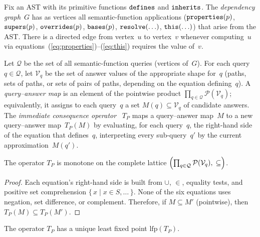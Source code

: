 \begin{definition}\label{def:dependency-graph}
  Fix an AST with its primitive functions $\mathtt{defines}$ and
  $\mathtt{inherits}$.
  The \emph{dependency graph}~$G$ has as vertices all
  semantic-function applications
  ($\mathtt{properties}(p)$, $\mathtt{supers}(p)$, $\mathtt{overrides}(p)$,
    $\mathtt{bases}(p)$, $\mathtt{resolve}(\ldots)$,
  $\mathtt{this}(\ldots)$) that arise from the AST\@.
  There is a directed edge from vertex~$u$ to vertex~$v$
  whenever computing~$u$ via
  equations~(\ref{eq:properties})--(\ref{eq:this})
  requires the value of~$v$.
\end{definition}

\begin{definition}%
  \label{def:tp-operator}
  Let $\mathcal{Q}$ be the set of all
  semantic-function queries
  (vertices of~$G$).
  For each query $q \in \mathcal{Q}$, let
  $\mathcal{V}_q$ be the set of answer values of the
  appropriate shape for~$q$
  (paths, sets of paths, or sets of pairs of paths,
  depending on the equation defining~$q$).
  A \emph{query--answer map} is an element of the
  pointwise product
  $\prod_{q \in \mathcal{Q}} \mathcal{P}(\mathcal{V}_q)$;
  equivalently, it assigns to each query~$q$ a set
  $M(q) \subseteq \mathcal{V}_q$ of candidate answers.
  The \emph{immediate consequence
  operator}~\cite{vanemden1976-predicate-logic-semantics}
  $T_P$ maps a query--answer map~$M$ to a new
  query--answer map~$T_P(M)$ by evaluating, for each
  query~$q$, the right-hand side of the equation that
  defines~$q$, interpreting every sub-query~$q'$ by
  the current approximation~$M(q')$.
\end{definition}

\begin{lemma}[Monotonicity]\label{lem:monotonicity}
  The operator $T_P$ is monotone on the complete lattice
  $\Bigl(\prod_{q \in \mathcal{Q}} \mathcal{P}(\mathcal{V}_q),\; \subseteq\Bigr)$.
\end{lemma}

\begin{proof}
  Each equation's right-hand side is built from
  $\cup$, $\in$, equality tests, and positive set
  comprehension $\{\, x \mid x \in S, \ldots \,\}$.
  None of the six equations uses negation, set
  difference, or complement.
  Therefore, if $M \subseteq M'$ (pointwise), then
  $T_P(M) \subseteq T_P(M')$.
\end{proof}

\begin{theorem}\label{thm:lfp-exists}
  The operator $T_P$ has a unique least fixed point
  $\mathrm{lfp}(T_P)$.
\end{theorem}


